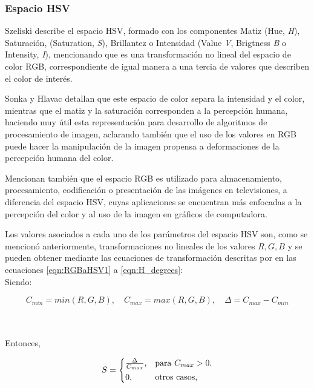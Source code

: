\subsubsection{Espacio HSV}
Szeliski describe el espacio HSV, formado con los componentes Matiz (Hue, \textit{H}), Saturación, (Saturation, \textit{S}), Brillantez o Intensidad (Value \textit{V}, Brigtness \textit{B} o Intensity, \textit{I}), mencionando que es una transformación no lineal del espacio de color RGB, correspondiente de igual manera a una tercia de valores que describen el color de interés.

Sonka y Hlavac \cite{czerwinski_definitions_2013} detallan que este espacio de color separa la intensidad y el color, mientras que el matiz y la saturación corresponden a la percepción humana, haciendo muy útil esta representación para desarrollo de algoritmos de procesamiento de imagen, aclarando también que el uso de los valores en RGB puede hacer la manipulación de la imagen propensa a deformaciones de la percepción humana del color. 

Mencionan también que el espacio RGB es utilizado para almacenamiento, procesamiento, codificación o presentación de las imágenes en televisiones, a diferencia del espacio HSV, cuyas aplicaciones se encuentran más enfocadas a la percepción del color y al uso de la imagen en gráficos de computadora.

Los valores asociados a cada uno de los parámetros del espacio HSV son, como se mencionó anteriormente, transformaciones no lineales de los valores  $R,G,B$ y se pueden obtener mediante las ecuaciones de transformación descritas por \cite{burger_digital_2022} en las ecuaciones \ref{eqn:RGBaHSV1} a \ref{eqn:H_degrees}:\\

Siendo:

\begin{equation}
C_{min} = min(R,G,B), \quad
C_{max} = max(R,G,B), \quad
\Delta = C_{max} - C_{min}
\label{eqn:RGBaHSV1}
\end{equation}

\phantom{holis}\\
\phantom{holis}\\
Entonces,

\begin{equation}
    S = \begin{cases*}
  \frac{\Delta}{C_{max}}, & para $C_{max} > 0$.\\
  0, & otros casos,
    \end{cases*}
    \label{eqn:Saturation}
\end{equation}

